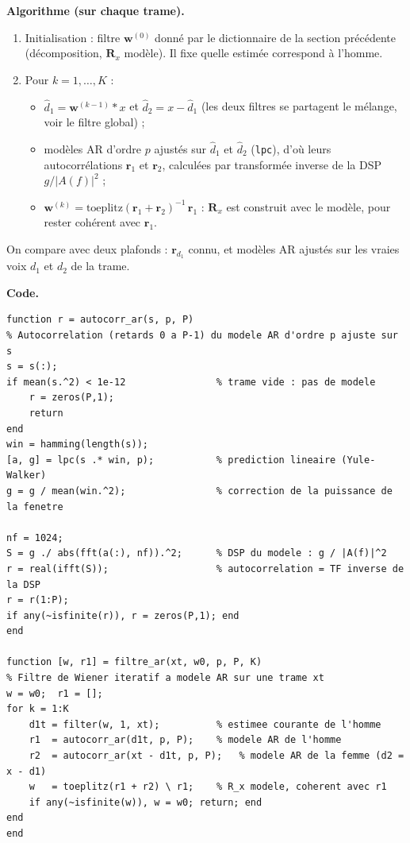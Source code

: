 \textbf{Algorithme (sur chaque trame).}
\begin{enumerate}
  \item Initialisation : filtre $\mathbf{w}^{(0)}$ donné par le dictionnaire de la section précédente (décomposition, $\mathbf{R}_x$ modèle). Il fixe quelle estimée correspond à l'homme.
  \item Pour $k=1,\dots,K$ :
  \begin{itemize}
    \item $\hat d_1=\mathbf{w}^{(k-1)}*x$ et $\hat d_2=x-\hat d_1$ (les deux filtres se partagent le mélange, voir le filtre global) ;
    \item modèles AR d'ordre $p$ ajustés sur $\hat d_1$ et $\hat d_2$ (\texttt{lpc}), d'où leurs autocorrélations $\mathbf{r}_1$ et $\mathbf{r}_2$, calculées par transformée inverse de la DSP $g/|A(f)|^2$ ;
    \item $\mathbf{w}^{(k)}=\mathrm{toeplitz}(\mathbf{r}_1+\mathbf{r}_2)^{-1}\,\mathbf{r}_1$ : $\mathbf{R}_x$ est construit avec le modèle, pour rester cohérent avec $\mathbf{r}_1$.
  \end{itemize}
\end{enumerate}
On compare avec deux plafonds : $\mathbf{r}_{d_1}$ connu, et modèles AR ajustés sur les vraies voix $d_1$ et $d_2$ de la trame.

\textbf{Code.}
\begin{lstlisting}
function r = autocorr_ar(s, p, P)
% Autocorrelation (retards 0 a P-1) du modele AR d'ordre p ajuste sur s
s = s(:);
if mean(s.^2) < 1e-12                % trame vide : pas de modele
    r = zeros(P,1);
    return
end
win = hamming(length(s));
[a, g] = lpc(s .* win, p);           % prediction lineaire (Yule-Walker)
g = g / mean(win.^2);                % correction de la puissance de la fenetre

nf = 1024;
S = g ./ abs(fft(a(:), nf)).^2;      % DSP du modele : g / |A(f)|^2
r = real(ifft(S));                   % autocorrelation = TF inverse de la DSP
r = r(1:P);
if any(~isfinite(r)), r = zeros(P,1); end
end

function [w, r1] = filtre_ar(xt, w0, p, P, K)
% Filtre de Wiener iteratif a modele AR sur une trame xt
w = w0;  r1 = [];
for k = 1:K
    d1t = filter(w, 1, xt);          % estimee courante de l'homme
    r1  = autocorr_ar(d1t, p, P);    % modele AR de l'homme
    r2  = autocorr_ar(xt - d1t, p, P);   % modele AR de la femme (d2 = x - d1)
    w   = toeplitz(r1 + r2) \ r1;    % R_x modele, coherent avec r1
    if any(~isfinite(w)), w = w0; return; end
end
end
\end{lstlisting}

